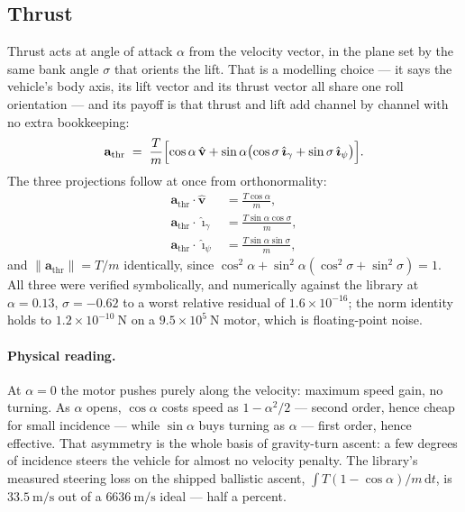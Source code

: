 \documentclass[11pt]{article}
\newcommand{\vhat}{\hat{\mathbf{v}}}
\newcommand{\ig}{\hat{\boldsymbol{\imath}}_{\gamma}}
\newcommand{\ip}{\hat{\boldsymbol{\imath}}_{\psi}}
\newcommand{\dd}{\mathrm{d}}
\begin{document}
\subsection{Thrust}
\label{sec:thrust}

Thrust acts at angle of attack $\alpha$ from the velocity vector, in the plane
set by the same bank angle $\sigma$ that orients the lift. That is a modelling
choice --- it says the vehicle's body axis, its lift vector and its thrust
vector all share one roll orientation --- and its payoff is that thrust and
lift add channel by channel with no extra bookkeeping:
\begin{equation}
  \mathbf{a}_{\text{thr}} \;=\; \frac{T}{m}\Bigl[
    \cos\alpha\,\vhat + \sin\alpha\bigl(\cos\sigma\,\ig
    + \sin\sigma\,\ip\bigr)\Bigr].
  \label{eq:athr}
\end{equation}
The three projections follow at once from orthonormality:
\begin{align}
  \mathbf{a}_{\text{thr}}\cdot\vhat &= \frac{T\cos\alpha}{m},
    \label{eq:tv}\\
  \mathbf{a}_{\text{thr}}\cdot\ig   &= \frac{T\sin\alpha\cos\sigma}{m},
    \label{eq:tg}\\
  \mathbf{a}_{\text{thr}}\cdot\ip   &= \frac{T\sin\alpha\sin\sigma}{m},
    \label{eq:tp}
\end{align}
and $\|\mathbf{a}_{\text{thr}}\| = T/m$ identically, since
$\cos^2\!\alpha + \sin^2\!\alpha(\cos^2\!\sigma+\sin^2\!\sigma) = 1$. All three
were verified symbolically, and numerically against the library at
$\alpha=0.13$, $\sigma=-0.62$ to a worst relative residual of
$1.6\times10^{-16}$; the norm identity holds to $1.2\times10^{-10}~\mathrm{N}$
on a $9.5\times10^{5}~\mathrm{N}$ motor, which is floating-point noise.

\paragraph{Physical reading.} At $\alpha=0$ the motor pushes purely along the
velocity: maximum speed gain, no turning. As $\alpha$ opens, $\cos\alpha$ costs
speed as $1-\alpha^2/2$ --- second order, hence cheap for small incidence ---
while $\sin\alpha$ buys turning as $\alpha$ --- first order, hence effective.
That asymmetry is the whole basis of gravity-turn ascent: a few degrees of
incidence steers the vehicle for almost no velocity penalty. The library's
measured steering loss on the shipped ballistic ascent,
$\int T(1-\cos\alpha)/m\,\dd t$, is $33.5~\mathrm{m/s}$ out of a
$6636~\mathrm{m/s}$ ideal --- half a percent.
\end{document}
